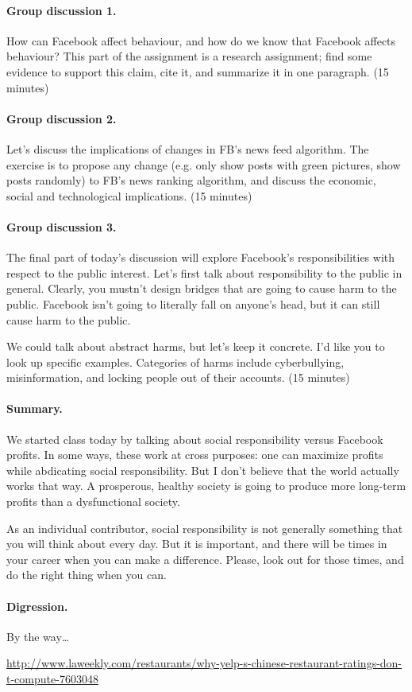 \documentclass[11pt]{article}
\begin{document}
\paragraph{Group discussion 1.} How can Facebook affect behaviour, and
how do we know that Facebook affects behaviour? This part of the
assignment is a research assignment; find some evidence to support
this claim, cite it, and summarize it in one paragraph. (15 minutes)

\paragraph{Group discussion 2.} Let's discuss the implications of changes in FB's news feed
algorithm.  The exercise is to propose any change (e.g. only show
posts with green pictures, show posts randomly) to FB's news ranking
algorithm, and discuss the economic, social and technological
implications. (15 minutes)

\paragraph{Group discussion 3.} The final part of today's discussion will explore Facebook's
responsibilities with respect to the public interest. Let's first
talk about responsibility to the public in general. Clearly, 
you mustn't design bridges that are going to cause harm to the public.
Facebook isn't going to literally fall on anyone's head, but it can
still cause harm to the public.

We could talk about abstract harms, but let's keep it concrete. I'd like
you to look up specific examples. Categories of harms include cyberbullying,
misinformation, and locking people out of their accounts. (15 minutes)

\paragraph{Summary.}
We started class today by talking about social responsibility versus Facebook
profits. In some ways, these work at cross purposes: one can maximize profits while 
abdicating social responsibility. But I don't believe that the world actually works
that way. A prosperous, healthy society is going to produce more long-term profits
than a dysfunctional society. 

As an individual contributor, social responsibility is not generally something
that you will think about every day. But it is important, and there will be times
in your career when you can make a difference. Please, look out for those times,
and do the right thing when you can.

\paragraph{Digression.} By the way\ldots

\scriptsize
\begin{center}
\url{http://www.laweekly.com/restaurants/why-yelp-s-chinese-restaurant-ratings-don-t-compute-7603048}
\end{center}
\end{document}
